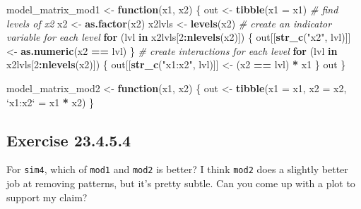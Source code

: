 \documentclass[]{book}
\newenvironment{Shaded}{\begin{snugshade}}{\end{snugshade}}
\newcommand{\CommentTok}[1]{\textcolor[rgb]{0.56,0.35,0.01}{\textit{#1}}}
\newcommand{\ControlFlowTok}[1]{\textcolor[rgb]{0.13,0.29,0.53}{\textbf{#1}}}
\newcommand{\DataTypeTok}[1]{\textcolor[rgb]{0.13,0.29,0.53}{#1}}
\newcommand{\DecValTok}[1]{\textcolor[rgb]{0.00,0.00,0.81}{#1}}
\newcommand{\KeywordTok}[1]{\textcolor[rgb]{0.13,0.29,0.53}{\textbf{#1}}}
\newcommand{\NormalTok}[1]{#1}
\newcommand{\OperatorTok}[1]{\textcolor[rgb]{0.81,0.36,0.00}{\textbf{#1}}}
\newcommand{\StringTok}[1]{\textcolor[rgb]{0.31,0.60,0.02}{#1}}
\theoremstyle{plain}
\theoremstyle{remark}
\begin{document}
\begin{Shaded}
\begin{Highlighting}[]
\NormalTok{model_matrix_mod1 <-}\StringTok{ }\ControlFlowTok{function}\NormalTok{(x1, x2) \{}
\NormalTok{  out <-}\StringTok{ }\KeywordTok{tibble}\NormalTok{(}\DataTypeTok{x1 =}\NormalTok{ x1)  }
  \CommentTok{# find levels of x2}
\NormalTok{  x2 <-}\StringTok{ }\KeywordTok{as.factor}\NormalTok{(x2)}
\NormalTok{  x2lvls <-}\StringTok{ }\KeywordTok{levels}\NormalTok{(x2)}
  \CommentTok{# create an indicator variable for each level}
  \ControlFlowTok{for}\NormalTok{ (lvl }\ControlFlowTok{in}\NormalTok{ x2lvls[}\DecValTok{2}\OperatorTok{:}\KeywordTok{nlevels}\NormalTok{(x2)]) \{}
\NormalTok{    out[[}\KeywordTok{str_c}\NormalTok{(}\StringTok{"x2"}\NormalTok{, lvl)]] <-}\StringTok{ }\KeywordTok{as.numeric}\NormalTok{(x2 }\OperatorTok{==}\StringTok{ }\NormalTok{lvl)}
\NormalTok{  \}}
  \CommentTok{# create interactions for each level}
  \ControlFlowTok{for}\NormalTok{ (lvl }\ControlFlowTok{in}\NormalTok{ x2lvls[}\DecValTok{2}\OperatorTok{:}\KeywordTok{nlevels}\NormalTok{(x2)]) \{}
\NormalTok{    out[[}\KeywordTok{str_c}\NormalTok{(}\StringTok{"x1:x2"}\NormalTok{, lvl)]] <-}\StringTok{ }\NormalTok{(x2 }\OperatorTok{==}\StringTok{ }\NormalTok{lvl) }\OperatorTok{*}\StringTok{ }\NormalTok{x1}
\NormalTok{  \}}
\NormalTok{  out}
\NormalTok{\}}
\end{Highlighting}
\end{Shaded}

\begin{Shaded}
\begin{Highlighting}[]
\NormalTok{model_matrix_mod2 <-}\StringTok{ }\ControlFlowTok{function}\NormalTok{(x1, x2) \{}
\NormalTok{  out <-}\StringTok{ }\KeywordTok{tibble}\NormalTok{(}\DataTypeTok{x1 =}\NormalTok{ x1,}
                \DataTypeTok{x2 =}\NormalTok{ x2,}
                \StringTok{`}\DataTypeTok{x1:x2}\StringTok{`}\NormalTok{ =}\StringTok{ }\NormalTok{x1 }\OperatorTok{*}\StringTok{ }\NormalTok{x2)}
\NormalTok{\}}
\end{Highlighting}
\end{Shaded}

\hypertarget{exercise-23.4.5.4}{%
\subsection*{\texorpdfstring{Exercise
{23.4.5.4}}{Exercise 23.4.5.4}}\label{exercise-23.4.5.4}}

For \texttt{sim4}, which of \texttt{mod1} and \texttt{mod2} is better? I
think \texttt{mod2} does a slightly better job at removing patterns, but
it's pretty subtle. Can you come up with a plot to support my claim?
\end{document}
